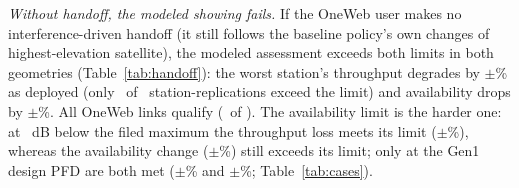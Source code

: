 \documentclass[conference]{IEEEtran}
\begin{document}
\emph{Without handoff, the modeled showing fails.}
If the OneWeb user makes no interference-driven handoff (it still follows the
baseline policy's own changes of highest-elevation satellite), the modeled
assessment exceeds both limits in both geometries (Table~\ref{tab:handoff}): the worst station's throughput degrades by
\DepGenTwoNoHoDegrPct$\pm$\DepGenTwoNoHoDegrCi\% as deployed (only
\DepGenTwoNoHoDegrOver\ of \DepGenTwoReps\ station-replications exceed the limit) and availability drops by \DepGenTwoNoHoUnavPct$\pm$\DepGenTwoNoHoUnavCi\%. All
OneWeb links qualify (\QualOneStationReps\ of \QualOneStationRepsTotal). The
availability limit is the harder one: at \PfdOffsetThreeDb~dB below the filed
maximum the throughput loss meets its limit
(\TabPfdMinusThreeDegrNoDivPct$\pm$\TabPfdMinusThreeDegrNoDivCi\%), whereas the
availability change (\TabPfdMinusThreeUnavNoDivPct$\pm$\TabPfdMinusThreeUnavNoDivCi\%)
still exceeds its limit; only at the Gen1 design PFD are both met
(\TabGenOneDegrNoDivPct$\pm$\TabGenOneDegrNoDivCi\% and
\TabGenOneUnavNoDivPct$\pm$\TabGenOneUnavNoDivCi\%; Table~\ref{tab:cases}).
\end{document}
